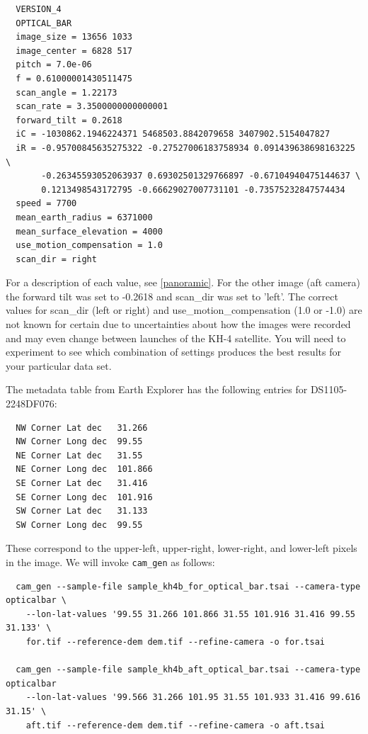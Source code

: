 \begin{verbatim}
  VERSION_4
  OPTICAL_BAR
  image_size = 13656 1033
  image_center = 6828 517
  pitch = 7.0e-06
  f = 0.61000001430511475
  scan_angle = 1.22173
  scan_rate = 3.3500000000000001
  forward_tilt = 0.2618
  iC = -1030862.1946224371 5468503.8842079658 3407902.5154047827
  iR = -0.95700845635275322 -0.27527006183758934 0.091439638698163225 \
       -0.26345593052063937 0.69302501329766897 -0.67104940475144637 \
       0.1213498543172795 -0.66629027007731101 -0.73575232847574434
  speed = 7700
  mean_earth_radius = 6371000
  mean_surface_elevation = 4000
  use_motion_compensation = 1.0
  scan_dir = right
\end{verbatim}

For a description of each value, see \ref{panoramic}.
For the other image (aft camera) the forward tilt was set to -0.2618 and scan\_dir was set to 'left'.
The correct values for scan\_dir (left or right) and use\_motion\_compensation (1.0 or -1.0) are not
known for certain due to uncertainties about how the images were recorded and may even change
between launches of the KH-4 satellite.  You will need to experiment to see which combination of settings
produces the best results for your particular data set.

The metadata table from Earth Explorer has the following entries
for DS1105-2248DF076:
\begin{verbatim}
  NW Corner Lat dec   31.266
  NW Corner Long dec  99.55
  NE Corner Lat dec   31.55
  NE Corner Long dec  101.866
  SE Corner Lat dec   31.416
  SE Corner Long dec  101.916
  SW Corner Lat dec   31.133
  SW Corner Long dec  99.55
\end{verbatim}

These correspond to the upper-left, upper-right, lower-right, and lower-left
pixels in the image. We will invoke \texttt{cam\_gen} as follows:

\begin{verbatim}
  cam_gen --sample-file sample_kh4b_for_optical_bar.tsai --camera-type opticalbar \
    --lon-lat-values '99.55 31.266 101.866 31.55 101.916 31.416 99.55 31.133' \
    for.tif --reference-dem dem.tif --refine-camera -o for.tsai

  cam_gen --sample-file sample_kh4b_aft_optical_bar.tsai --camera-type opticalbar
    --lon-lat-values '99.566 31.266 101.95 31.55 101.933 31.416 99.616 31.15' \
    aft.tif --reference-dem dem.tif --refine-camera -o aft.tsai
\end{verbatim}

